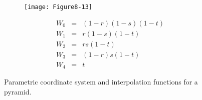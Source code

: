 \begin{description}[leftmargin=0cm,labelindent=0cm]
    \begin{figure}[!htb]
        \centering
        \begin{subfigure}{0.48\linewidth}
            \centering
            \texttt{[image: Figure8-13]}
            \caption*{}
        \end{subfigure}
        \hfill
        \begin{subfigure}{0.48\linewidth}
            \centering
            \begin{equation*}
            \begin{array}{lll}
            W_0 &=& (1-r)(1-s)(1-t) \\
            W_1 &=& r(1-s)(1-t) \\
            W_2 &=& r s (1-t) \\
            W_3 &=& (1-r)s(1-t) \\
            W_4 &=& t
            \end{array}
            \end{equation*}
        \end{subfigure}%
        \caption{Parametric coordinate system and interpolation functions for a pyramid.}
        \label{fig:Figure8-13}
    \end{figure}


\end{description}
